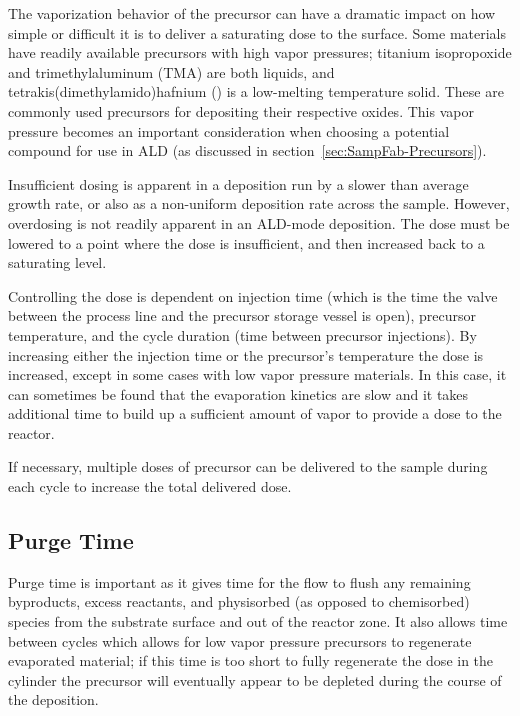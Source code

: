 The vaporization behavior of the precursor can have a dramatic impact on how simple or difficult it is to deliver a saturating dose to the surface. Some materials have readily available precursors with high vapor pressures; titanium isopropoxide and trimethylaluminum (TMA) are both liquids, and tetrakis(dimethylamido)hafnium () is a low-melting temperature solid. These are commonly used precursors for depositing their respective oxides. This vapor pressure becomes an important consideration when choosing a potential compound for use in ALD (as discussed in section~\vref{sec:SampFab-Precursors}).\cite{ALD-Handbook,kanjolia_design_2008,Leskela_2002,lim_atomic_2003,Ritala_ALD_2003}

Insufficient dosing is apparent in a deposition run by a slower than average growth rate, or also as a non-uniform deposition rate across the sample. However, overdosing is not readily apparent in an ALD-mode deposition. The dose must be lowered to a point where the dose is insufficient, and then increased back to a saturating level. 

Controlling the dose is dependent on injection time (which is the time the valve between the process line and the precursor storage vessel is open), precursor temperature, and the cycle duration (time between precursor injections). By increasing either the injection time or the precursor's temperature the dose is increased, except in some cases with low vapor pressure materials. In this case, it can sometimes be found that the evaporation kinetics are slow and it takes additional time to build up a sufficient amount of vapor to provide a dose to the reactor.\cite{ALD-Handbook,lim_atomic_2003,Ritala_ALD_2003} 

If necessary, multiple doses of precursor can be delivered to the sample during each cycle to increase the total delivered dose.


\subsection{Purge Time}

Purge time is important as it gives time for the  flow to flush any remaining byproducts, excess reactants, and physisorbed (as opposed to chemisorbed) species from the substrate surface and out of the reactor zone. It also allows time between cycles which allows for low vapor pressure precursors to regenerate evaporated material; if this time is too short to fully regenerate the dose in the cylinder the precursor will eventually appear to be depleted during the course of the deposition.\cite{ALD-Handbook,Leskela_2002}

